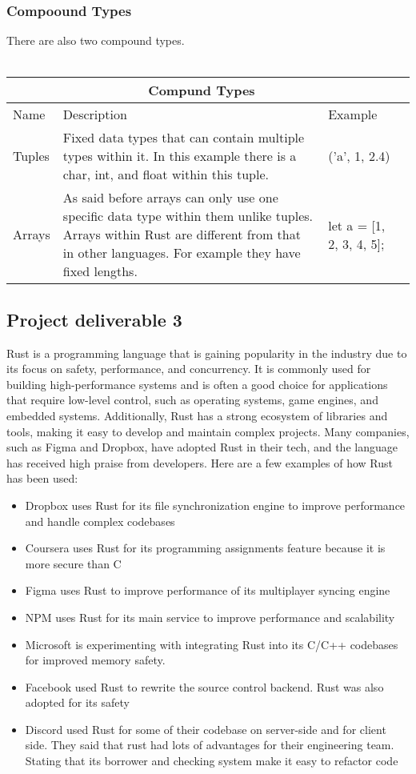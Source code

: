 \documentclass{article}
\theoremstyle{theorem}
\theoremstyle{definition}
\theoremstyle{remark}
\begin{document}
\subsubsection{Compoound Types}
There are also two compound types. 
 \\ 
  \\ 
\begin{center}
\begin{tabular}{ |p{5cm}||p{5cm}|p{5cm}|p{5cm}|  }
 \hline
 \multicolumn{3}{|c|}{Compund Types} \\
 \hline
 Name & Description & Example\\
 \hline
 Tuples   & Fixed data types that can contain multiple types within it. In this example there is a char, int, and float within this tuple.
    &('a', 1, 2.4) \\
    \hline
 Arrays &  As said before arrays can only use one specific data type within them unlike tuples. Arrays within Rust are different from that in other languages. For example they have fixed lengths. & let a = [1, 2, 3, 4, 5]; \\
  \hline
\end{tabular}
\end{center}
\subsection{Project deliverable 3 }
Rust is a programming language that is gaining popularity in the industry due to its focus on safety, performance, and concurrency. It is commonly used for building high-performance systems and is often a good choice for applications that require low-level control, such as operating systems, game engines, and embedded systems. Additionally, Rust has a strong ecosystem of libraries and tools, making it easy to develop and maintain complex projects. Many companies, such as Figma and Dropbox, have adopted Rust in their tech, and the language has received high praise from developers. Here are a few examples of how Rust has been used:
\begin{itemize}
\item Dropbox uses Rust for its file synchronization engine to improve performance and handle complex codebases
\item Coursera uses Rust for its programming assignments feature because it is more secure than C
\item Figma uses Rust to improve performance of its multiplayer syncing engine
\item NPM uses Rust for its main service to improve performance and scalability
\item Microsoft is experimenting with integrating Rust into its C/C++ codebases for improved memory safety.
\item Facebook used Rust to rewrite the source control backend. Rust was also adopted for its safety
\item Discord used Rust for some of their codebase on server-side and for client side. They said that rust had lots of advantages for their engineering team. Stating that its borrower and checking system make it easy to refactor code
\end{itemize}
\end{document}
